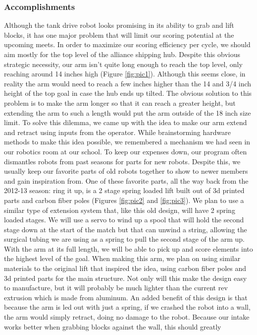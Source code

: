 \subsubsection*{Accomplishments}
Although the tank drive robot looks promising in its ability to grab and lift blocks, it has one major problem that will limit our scoring potential at the upcoming meets. In order to maximize our scoring efficiency per cycle, we should aim mostly for the top level of the alliance shipping hub. Despite this obvious strategic necessity, our arm isn’t quite long enough to reach the top level, only reaching around 14 inches high (Figure \ref{fig:pic1}). Although this seems close, in reality the arm would need to reach a few inches higher than the 14 and 3/4 inch height of the top goal in case the hub ends up tilted. The obvious solution to this problem is to make the arm longer so that it can reach a greater height, but extending the arm to such a length would put the arm outside of the 18 inch size limit. 
To solve this dilemma, we came up with the idea to make our arm extend and retract using inputs from the operator. While brainstorming hardware methods to make this idea possible, we remembered a mechanism we had seen in our robotics room at our school. To keep our expenses down, our program often dismantles robots from past seasons for parts for new robots. Despite this, we usually keep our favorite parts of old robots together to show to newer members and gain inspiration from. One of these favorite parts, all the way back from the 2012-13 season: ring it up, is a 2 stage spring loaded lift built out of 3d printed parts and carbon fiber poles (Figures \ref{fig:pic2} and \ref{fig:pic3}). We plan to use a similar type of extension system that, like this old design, will have 2 spring loaded stages. We will use a servo to wind up a spool that will hold the second stage down at the start of the match but that can unwind a string, allowing the surgical tubing we are using as a spring to pull the second stage of the arm up. With the arm at its full length, we will be able to pick up and score elements into the highest level of the goal. 
When making this arm, we plan on using similar materials to the original lift that inspired the idea, using carbon fiber poles and 3d printed parts for the main structure. Not only will this make the design easy to manufacture, but it will probably be much lighter than the current rev extrusion which is made from aluminum.
An added benefit of this design is that because the arm is led out with just a spring, if we crashed the robot into a wall, the arm would simply retract, doing no damage to the robot. Because our intake works better when grabbing blocks against the wall, this should greatly 

